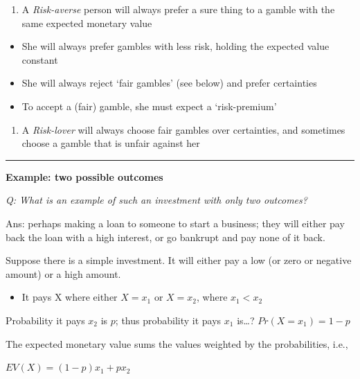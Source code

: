 \documentclass[]{article}
\providecommand{\tightlist}{%
  \setlength{\itemsep}{0pt}\setlength{\parskip}{0pt}}
\begin{document}
\begin{enumerate}
\def\labelenumi{\arabic{enumi}.}
\setcounter{enumi}{1}
\tightlist
\item
  A \emph{Risk-averse} person will always prefer a sure thing to a
  gamble with the same expected monetary value
\end{enumerate}

\begin{itemize}
\tightlist
\item
  She will always prefer gambles with less risk, holding the expected
  value constant
\item
  She will always reject `fair gambles' (see below) and prefer
  certainties
\item
  To accept a (fair) gamble, she must expect a `risk-premium'
\end{itemize}

\begin{enumerate}
\def\labelenumi{\arabic{enumi}.}
\setcounter{enumi}{2}
\tightlist
\item
  A \emph{Risk-lover} will always choose fair gambles over certainties,
  and sometimes choose a gamble that is unfair against her
\end{enumerate}

\begin{center}\rule{0.5\linewidth}{\linethickness}\end{center}

\textbf{Example: two possible outcomes}

\emph{Q: What is an example of such an investment with only two
outcomes?}

Ans: perhaps making a loan to someone to start a business; they will
either pay back the loan with a high interest, or go bankrupt and pay
none of it back.

Suppose there is a simple investment. It will either pay a low (or zero
or negative amount) or a high amount.

\begin{itemize}
\tightlist
\item
  It pays X where either \(X =x_1\) or \(X=x_2\), where \(x_1<x_2\)
\end{itemize}

Probability it pays \(x_2\) is \(p\); thus probability it pays \(x_1\)
is\ldots? \(Pr(X=x_1)= 1-p\)

The expected monetary value sums the values weighted by the
probabilities, i.e.,

\(EV(X)=(1-p) x_1 + p x_2\)
\end{document}
